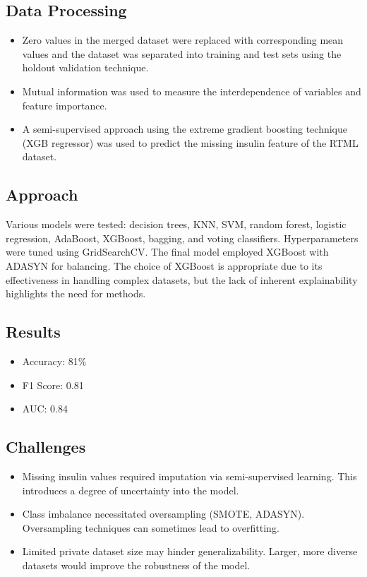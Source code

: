 \subsection*{Data Processing}
\begin{itemize}
    \item Zero values in the merged dataset were replaced with corresponding mean values and the dataset was separated into training and test sets using the holdout validation technique.
    \item Mutual information was used to measure the interdependence of variables and feature importance.
    \item A semi-supervised approach using the extreme gradient boosting technique (XGB regressor) was used to predict the missing insulin feature of the RTML dataset.
\end{itemize}

\subsection*{Approach}
Various models were tested: decision trees, KNN, SVM, random forest, logistic regression, AdaBoost, XGBoost, bagging, and voting classifiers. Hyperparameters were tuned using GridSearchCV. The final model employed XGBoost with ADASYN for balancing. The choice of XGBoost is appropriate due to its effectiveness in handling complex datasets, but the lack of inherent explainability highlights the need for methods.

\subsection*{Results}
\begin{itemize}
    \item Accuracy: 81\%
    \item F1 Score: 0.81
    \item AUC: 0.84
\end{itemize}

\subsection*{Challenges}
\begin{itemize}
    \item Missing insulin values required imputation via semi-supervised learning. This introduces a degree of uncertainty into the model.
    \item Class imbalance necessitated oversampling (SMOTE, ADASYN). Oversampling techniques can sometimes lead to overfitting.
    \item Limited private dataset size may hinder generalizability. Larger, more diverse datasets would improve the robustness of the model.
\end{itemize}

